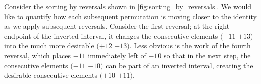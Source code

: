 
Consider the sorting by reversals shown in \autoref{fig:sorting_by_reversals}. We would like to quantify how each subsequent permutation is moving closer to the identity as we apply subsequent reversals. Consider the first reversal; at the right endpoint of the inverted interval, it changes the consecutive elements $(-11$ $+13)$ into the much more desirable $(+12$ $+13)$.  Less obvious is the work of the fourth reversal, which places $-11$ immediately left of $-10$ so that in the next step, the consecutive elements $(-11$ $-10)$ can be part of an inverted interval, creating the desirable consecutive elements  $(+10$ $+11)$.\\

